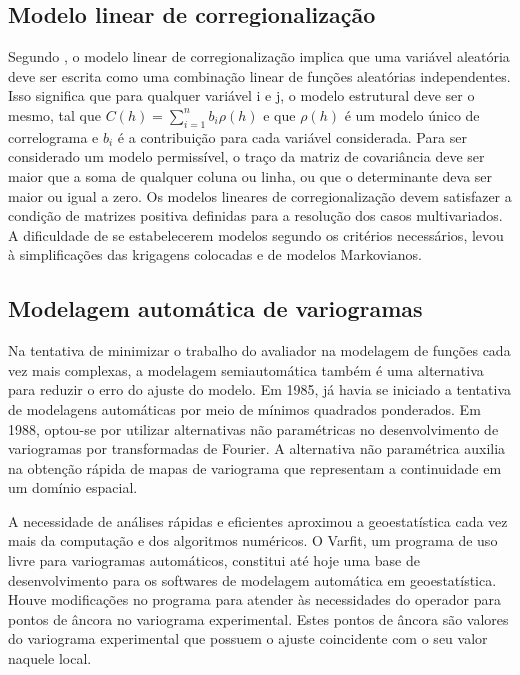\subsection{Modelo linear de corregionalização}

Segundo , o modelo linear de corregionalização implica que uma variável aleatória deve ser escrita como uma combinação linear de funções aleatórias independentes. Isso significa que para qualquer variável i e j, o modelo estrutural deve ser o mesmo, tal que $C(h)=\sum_{i=1}^{n} b_i\rho(h) $ e que $\rho(h)$ é um modelo único de correlograma e $b_i$ é a contribuição para cada variável considerada. Para ser considerado um modelo permissível, o traço da matriz de covariância deve ser maior que a soma de qualquer coluna ou linha, ou que o determinante deva ser maior ou igual a zero. Os modelos lineares de corregionalização devem satisfazer a condição de matrizes positiva definidas para a resolução dos casos multivariados. A dificuldade de se estabelecerem modelos segundo os critérios necessários, levou à simplificações das krigagens colocadas e de modelos Markovianos. 

\subsection{Modelagem automática de variogramas}

Na tentativa de minimizar o trabalho do avaliador na modelagem de funções cada vez mais complexas, a modelagem semiautomática também é uma alternativa para reduzir o erro do ajuste do modelo. Em 1985, já havia se iniciado a tentativa de modelagens automáticas por meio de mínimos quadrados ponderados. Em 1988, optou-se por utilizar alternativas não paramétricas no desenvolvimento de variogramas por transformadas de Fourier. A alternativa não paramétrica auxilia na obtenção rápida de mapas de variograma que representam a continuidade em um domínio espacial. 

A necessidade de análises rápidas e eficientes aproximou a geoestatística cada vez mais da computação e dos algoritmos numéricos. O Varfit, um programa de uso livre para variogramas automáticos, constitui até hoje uma base de desenvolvimento para os softwares de modelagem automática em geoestatística. Houve modificações no programa para atender às necessidades do operador para pontos de âncora no variograma experimental. Estes pontos de âncora são valores do variograma experimental que possuem o ajuste coincidente com o seu valor naquele local.

